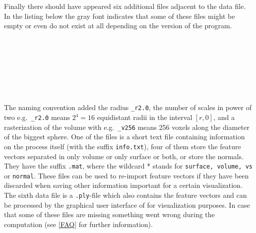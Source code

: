 Finally there should have appeared six additional files adjacent to the data file. In the listing below the gray font indicates that some of these files might be empty or even do not exist at all depending on the version of the program.

\hspace*{4.0cm}{\tt <filename>\_r2.00\_n4\_v256.info.txt} \\
\hspace*{4.0cm}{\tt <filename>\_r2.00\_n4\_v256.normal.mat} \\
\hspace*{4.0cm}{\tt <filename>\_r2.00\_n4\_v256.ply} \\
\color{gray}
\hspace*{4.0cm}{\tt <filename>\_r2.00\_n4\_v256.surface.mat} \\
\hspace*{4.0cm}{\tt <filename>\_r2.00\_n4\_v256.volume.mat} \\
\hspace*{4.0cm}{\tt <filename>\_r2.00\_n4\_v256.vs.mat} \\
\color{black}

The naming convention added the radius {\tt \_r2.0}, the number of scales in power of two e.g.~{\tt \_r2.0} means $2^4=16$ equidistant radii in the interval $[r, 0]$, and a rasterization of the volume with e.g.~{\tt \_v256} means 256 voxels along the diameter of the biggest sphere.  One of the files is a short text file containing information on the process itself (with the suffix {\tt info.txt}), four of them store the feature vectors separated in only volume  or only surface or both, or store the normals. They have the suffix {\tt *.mat}, where the wildcard * stands for {\tt surface, volume, vs} or {\tt normal}. These files can be used to re-import feature vectors if they have been discarded when saving other information important for a certain visualization. The sixth data file is a {\tt *.ply}-file which also contains the feature vectors and can be processed by the graphical user interface of \GigaMesh for visualization purposes. In case that some of these files are missing something went wrong during the computation (see \ref{FAQ} for further information).


